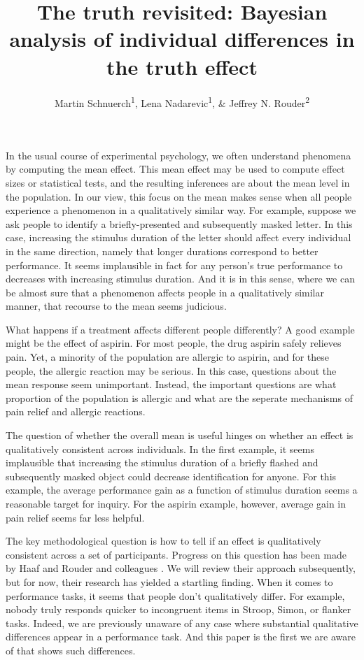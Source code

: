 \documentclass[
  english,
  ,man,floatsintext]{apa6}
\author{Martin Schnuerch\textsuperscript{1}, Lena Nadarevic\textsuperscript{1}, \& Jeffrey N. Rouder\textsuperscript{2}}
\affiliation{
\vspace{0.5cm}
\textsuperscript{1} University of Mannheim\\\textsuperscript{2} University of California, Irvine}
\title{The truth revisited: Bayesian analysis of individual differences in the truth effect}
\date{}
\begin{document}
\maketitle

In the usual course of experimental psychology, we often understand phenomena by computing the mean effect. This mean effect may be used to compute effect sizes or statistical tests, and the resulting inferences are about the mean level in the population. In our view, this focus on the mean makes sense when all people experience a phenomenon in a qualitatively similar way. For example, suppose we ask people to identify a briefly-presented and subsequently masked letter. In this case, increasing the stimulus duration of the letter should affect every individual in the same direction, namely that longer durations correspond to better performance. It seems implausible in fact for any person's true performance to decreases with increasing stimulus duration. And it is in this sense, where we can be almost sure that a phenomenon affects people in a qualitatively similar manner, that recourse to the mean seems judicious.

What happens if a treatment affects different people differently? A good example might be the effect of aspirin. For most people, the drug aspirin safely relieves pain. Yet, a minority of the population are allergic to aspirin, and for these people, the allergic reaction may be serious. In this case, questions about the mean response seem unimportant. Instead, the important questions are what proportion of the population is allergic and what are the seperate mechanisms of pain relief and allergic reactions.

The question of whether the overall mean is useful hinges on whether an effect is qualitatively consistent across individuals. In the first example, it seems implausible that increasing the stimulus duration of a briefly flashed and subsequently masked object could decrease identification for anyone. For this example, the average performance gain as a function of stimulus duration seems a reasonable target for inquiry. For the aspirin example, however, average gain in pain relief seems far less helpful.

The key methodological question is how to tell if an effect is qualitatively consistent across a set of participants. Progress on this question has been made by Haaf and Rouder and colleagues \autocite{thiele2017,haaf2017,haaf2019}. We will review their approach subsequently, but for now, their research has yielded a startling finding. When it comes to performance tasks, it seems that people don't qualitatively differ. For example, nobody truly responds quicker to incongruent items in Stroop, Simon, or flanker tasks. Indeed, we are previously unaware of any case where substantial qualitative differences appear in a performance task. And this paper is the first we are aware of that shows such differences.
\end{document}
